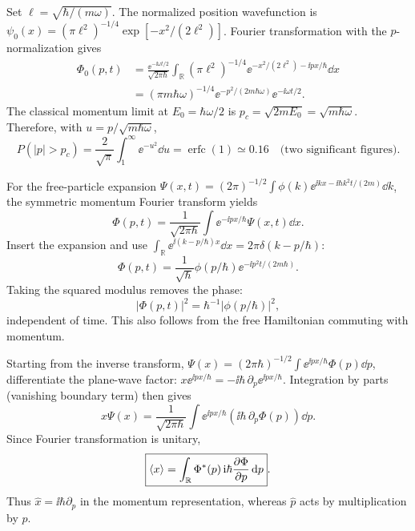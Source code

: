 Set $\ell=\sqrt{\hbar/(m\omega)}$. The normalized
position wavefunction is
$\psi_0(x)=(\pi\ell^2)^{-1/4}
\exp[-x^2/(2\ell^2)]$.
Fourier transformation with the $p$-normalization gives
\begin{align}
\Phi_0(p,t)&=\frac{\ee^{-\ii\omega t/2}}
{\sqrt{2\pi\hbar}}\int_{\mathbb R}
(\pi\ell^2)^{-1/4}
\ee^{-x^2/(2\ell^2)-\ii px/\hbar}\dd x\\
&=\boxed{(\pi m\hbar\omega)^{-1/4}
\ee^{-p^2/(2m\hbar\omega)}
\ee^{-\ii\omega t/2}}.
\end{align}
The classical momentum limit at $E_0=\hbar\omega/2$
is $p_c=\sqrt{2mE_0}=\sqrt{m\hbar\omega}$.
Therefore, with $u=p/\sqrt{m\hbar\omega}$,
\begin{equation}
P(|p|>p_c)=\frac2{\sqrt\pi}\int_1^\infty
\ee^{-u^2}\dd u=\operatorname{erfc}(1)
\simeq\boxed{0.16\quad\text{(two significant figures)}}.
\end{equation}

For the free-particle expansion
$\Psi(x,t)=
(2\pi)^{-1/2}\int\phi(k)
\ee^{\ii kx-\ii\hbar k^2t/(2m)}\dd k$,
the symmetric momentum Fourier transform yields
\begin{equation}
\Phi(p,t)=\frac1{\sqrt{2\pi\hbar}}
\int\ee^{-\ii px/\hbar}\Psi(x,t)\dd x.
\end{equation}
Insert the expansion and use
$\int_{\mathbb R}\ee^{\ii(k-p/\hbar)x}\dd x
=2\pi\delta(k-p/\hbar)$:
\begin{equation}
\boxed{\Phi(p,t)=\frac1{\sqrt\hbar}
\phi(p/\hbar)\ee^{-\ii p^2t/(2m\hbar)}}.
\end{equation}
Taking the squared modulus removes the phase:
\begin{equation}
\boxed{|\Phi(p,t)|^2=
\hbar^{-1}|\phi(p/\hbar)|^2},
\end{equation}
independent of time. This also follows
from the free Hamiltonian commuting with momentum.

Starting from the inverse transform,
$\Psi(x)=(2\pi\hbar)^{-1/2}\int
\ee^{\ii px/\hbar}\Phi(p)\dd p$,
differentiate the plane-wave factor:
$x\ee^{\ii px/\hbar}=
-\ii\hbar\,\partial_p\ee^{\ii px/\hbar}$.
Integration by parts (vanishing boundary term) then gives
\begin{equation}
x\Psi(x)=\frac1{\sqrt{2\pi\hbar}}
\int\ee^{\ii px/\hbar}
\left(\ii\hbar\,\partial_p\Phi(p)\right)\dd p.
\end{equation}
Since Fourier transformation is unitary,
\begin{equation}
\boxed{\left\langle x\right\rangle=\int_{\mathbb R}
\Phi^*(p)\,\mathrm{i}\hbar\frac{\partial\Phi}{\partial p}\,\mathrm{d} p}.
\end{equation}
Thus $\hat x=\ii\hbar\partial_p$
in the momentum representation, whereas
$\hat p$ acts by multiplication by $p$.


